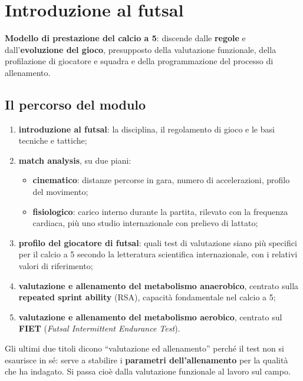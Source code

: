 \chapter{Introduzione al futsal}
\label{cap:introfutsal}

\textbf{Modello di prestazione del calcio a 5}: discende dalle \textbf{regole} e
dall'\textbf{evoluzione del gioco}, presupposto della valutazione funzionale, della profilazione di
giocatore e squadra e della programmazione del processo di allenamento.

\section{Il percorso del modulo}

\begin{enumerate}
  \item \textbf{introduzione al futsal}: la disciplina, il regolamento di gioco e le basi tecniche e
    tattiche;
  \item \textbf{match analysis}, su due piani:
    \begin{itemize}
      \item \textbf{cinematico}: distanze percorse in gara, numero di accelerazioni, profilo del
        movimento;
      \item \textbf{fisiologico}: carico interno durante la partita, rilevato con la frequenza
        cardiaca, più uno studio internazionale con prelievo di lattato;
    \end{itemize}
  \item \textbf{profilo del giocatore di futsal}: quali test di valutazione siano più specifici per
    il calcio a 5 secondo la letteratura scientifica internazionale, con i relativi valori di
    riferimento;
  \item \textbf{valutazione e allenamento del metabolismo anaerobico}, centrato sulla
    \textbf{repeated sprint ability} (RSA), capacità fondamentale nel calcio a 5;
  \item \textbf{valutazione e allenamento del metabolismo aerobico}, centrato sul \textbf{FIET}
    (\textit{Futsal Intermittent Endurance Test}).
\end{enumerate}
Gli ultimi due titoli dicono ``valutazione ed allenamento'' perché il test non si esaurisce in sé:
serve a stabilire i \textbf{parametri dell'allenamento} per la qualità che ha indagato. Si passa
cioè dalla valutazione funzionale al lavoro sul campo.

